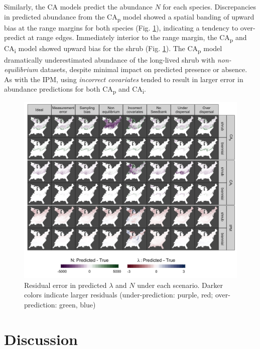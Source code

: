 \documentclass[preprint,review,times,12pt]{elsarticle}
\begin{document}
Similarly, the CA models predict the abundance $N$ for each species. Discrepancies in predicted abundance from the CA\textsubscript{p} model showed a spatial banding of upward bias at the range margins for both species (Fig. \ref{fig:N_Lambda}), indicating a tendency to over-predict at range edges. Immediately interior to the range margin, the CA\textsubscript{p} and CA\textsubscript{i} model showed upward bias for the shrub (Fig. \ref{fig:N_Lambda}). The CA\textsubscript{p} model dramatically underestimated abundance of the long-lived shrub with \emph{non-equilibrium} datasets, despite minimal impact on predicted presence or absence. As with the IPM, using \emph{incorrect covariates} tended to result in larger error in abundance predictions for both CA\textsubscript{p} and CA\textsubscript{i}.

\begin{figure}
	\centering\includegraphics[width=\linewidth]{figs/map_N_Lambda.jpg}
	\caption{\label{fig:N_Lambda} Residual error in predicted $\lambda$ and $N$ under each scenario. Darker colors indicate larger residuals (under-prediction: purple, red; over-prediction: green, blue)}
\end{figure}


\section{Discussion}
\label{S:4}

\end{document}

